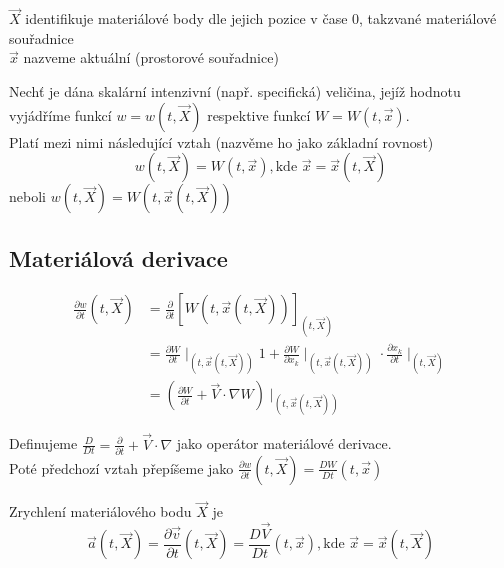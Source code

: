 \documentclass[../main.tex]{subfiles}
\begin{document}
$\vec{X}$ identifikuje materiálové body dle jejich pozice v čase 0, takzvané materiálové souřadnice\\
$\vec{x}$ nazveme aktuální (prostorové souřadnice)



Nechť je dána skalární intenzivní (např. specifická) veličina, jejíž hodnotu vyjádříme funkcí $w=w(t, \vec{X})$
respektive funkcí $W = W(t, \vec{x})$.\\
Platí mezi nimi následující vztah (nazvěme ho jako základní rovnost)
\begin{equation*}
    w(t,\vec{X}) = W(t, \vec{x}), \text{kde } \vec{x} = \vec{x}(t, \vec{X})  
\end{equation*} 
neboli $w(t, \vec{X}) = W(t, \vec{x}(t, \vec{X}))$




\subsection{Materiálová derivace}

\begin{align*}
    \frac{\partial w}{\partial t} (t, \vec{X}) &= \frac{\partial}{\partial t} \left[ W(t, \vec{x}(t, \vec{X}))  \right]_(t, \vec{X})\\
    &= \frac{\partial W}{\partial t}\mid_{(t, \vec{x}(t, \vec{X}))}1  + \frac{\partial W}{\partial x_k}\mid_{(t, \vec{x}(t, \vec{X}))} \cdot \frac{\partial x_k}{\partial t} \mid_{(t,\vec{X})}\\
    &= \left(  \frac{\partial W}{\partial t} + \vec{V} \cdot \nabla W                     \right)\mid_{(t, \vec{x}(t, \vec{X}))}
\end{align*}

Definujeme $\frac{D}{D t} = \frac{\partial}{ \partial t} + \vec{V} \cdot \nabla$ jako operátor materiálové derivace.\\
Poté předchozí vztah přepíšeme jako $\frac{\partial w}{\partial t} (t, \vec{X}) = \frac{D W}{D t} (t, \vec{x})$

\begin{example}
    Zrychlení materiálového bodu $\vec{X}$ je 
    \begin{equation*}
        \vec{a}(t, \vec{X}) = \frac{\partial \vec{v}}{\partial t} (t, \vec{X}) = \frac{D \vec{V}}{D t} (t, \vec{x}), \text{kde } \vec{x} = \vec{x}(t, \vec{X})
    \end{equation*}
\end{example}
\end{document}
